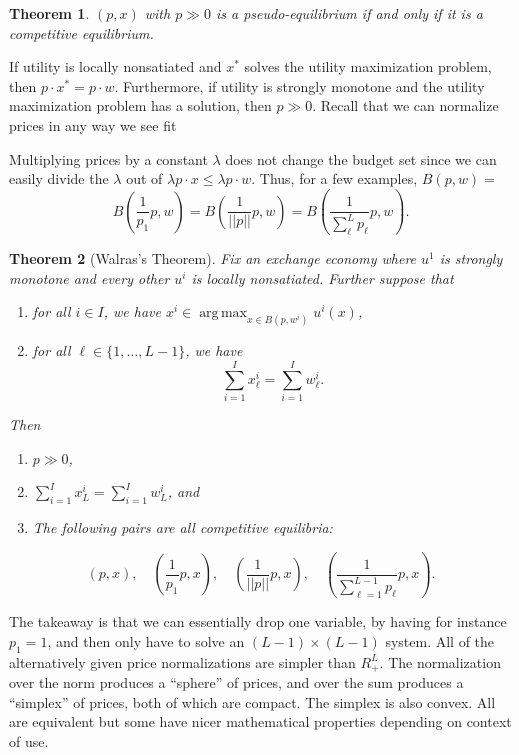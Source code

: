 \documentclass[11pt, twocolumn]{article}
\DeclareMathOperator*{\argmax}{arg\,max}
\newtheorem{theorem}{Theorem}
\theoremstyle{definition}
\begin{document}
\begin{theorem}
	$(p,x)$ with $p \gg 0$ is a pseudo-equilibrium if and only if it is a competitive equilibrium. 
\end{theorem}


If utility is locally nonsatiated and $x^*$ solves the utility maximization problem, then $p \cdot x^* = p \cdot w$. Furthermore, if utility is strongly monotone and the utility maximization problem has a solution, then $p \gg 0$. Recall that we can normalize prices in any way we see fit

Multiplying prices by a constant $\lambda$ does not change the budget set since we can easily divide the $\lambda$ out of $\lambda p \cdot x \leq \lambda p \cdot w$. Thus, for a few examples, $B(p,w) =$
\[B \left( \frac{1}{p_1} p, w\right) = B\left(\frac{1}{||p||}p,w\right) = B\left( \frac{1}{\sum_{\ell}^L p_{\ell}} p,w\right).	\]	

\begin{theorem}[Walras's Theorem]
	Fix an exchange economy where $u^1$ is strongly monotone and every other $u^i$ is locally nonsatiated. Further suppose that
	\begin{enumerate}
		\item for all $i \in I$, we have $x^i \in \argmax_{x \in B(p,w^i)} u^i(x)$,
		\item for all $\ell \in \{1, \hdots, L-1\}$, we have 
			\[\sum_{i=1}^I x^i_{\ell} = \sum_{i=1}^I w^i_{\ell}.	\]
	\end{enumerate}
	Then
	\begin{enumerate}	
		\item $p \gg 0$,
		\item $\sum_{i=1}^I x^i_L = \sum_{i=1}^I w^i_L$, and 
		\item The following pairs are all competitive equilibria:
	\end{enumerate}
\[(p,x), \quad \left( \frac{1}{p_1}p, x \right), \quad \left( \frac{1}{||p||}p, x\right), \quad \left( \frac{1}{\sum_{\ell=1}^{L-1} p_{\ell}} p,x\right).	\]	
\end{theorem}
The takeaway is that we can essentially drop one variable, by having for instance $p_1=1$, and then only have to solve an $(L-1) \times (L-1)$ system. All of the alternatively given price normalizations are simpler than $R^L_+$. The normalization over the norm produces a ``sphere'' of prices, and over the sum produces a ``simplex'' of prices, both of which are compact. The simplex is also convex. All are equivalent but some have nicer mathematical properties depending on context of use. 
\end{document}
